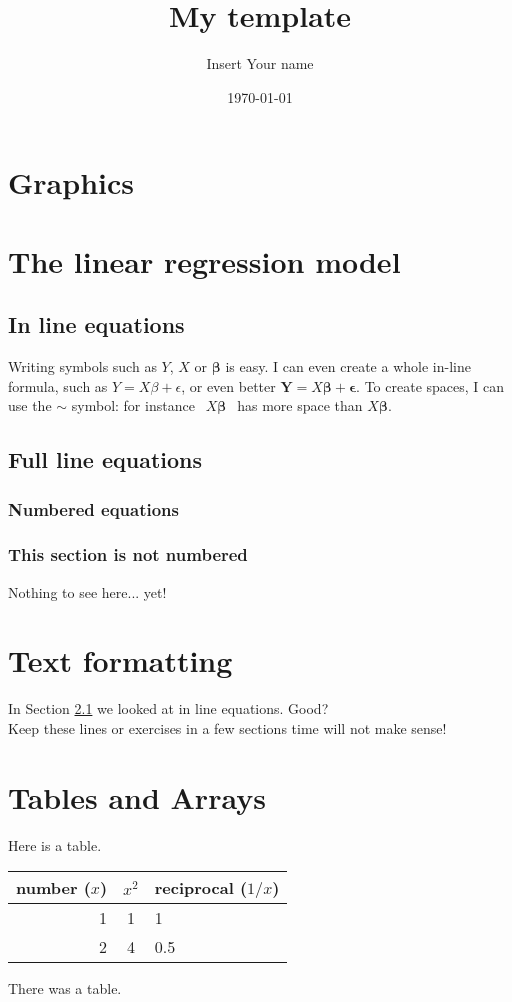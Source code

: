\documentclass[11pt]{article}
\title{My template}
\author{Insert Your name}
\date{\today}
\begin{document}
\maketitle
\section{Graphics}
\section{The linear regression model}
\subsection{In line equations}
\label{sect.myfirst}
Writing symbols such as $Y$, $X$ or $\boldsymbol{\beta}$ is easy. I can
even create a whole in-line formula, such as $Y=X\beta+\epsilon$, or even better
$\textbf{Y}=X\boldsymbol{\beta}+\boldsymbol{\epsilon}$. To create spaces,
I can use the $\sim$ symbol: for instance $~~X\boldsymbol\beta~~$ has more
space than $X\boldsymbol\beta$.
\subsection{Full line equations}
\subsubsection{Numbered equations}
\subsubsection*{This section is not numbered}
Nothing to see here... yet!
\section{Text formatting}
In Section \ref{sect.myfirst} we looked at in line equations.
Good?\\ Keep these lines or exercises in a few
sections time will not make sense!
\section{Tables and Arrays}
Here is a table.
\begin{center}
\begin{tabular}{r|cl} %
number ($x$) & $x^2$ & reciprocal ($1/x$)\\
\hline %
1 & 1 & 1\\
2 & 4 & 0.5

\end{tabular}
\end{center}
There was a table.
\end{document}
